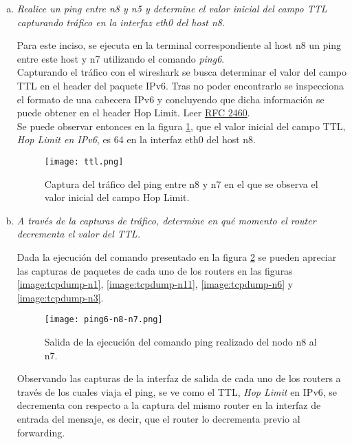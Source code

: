 \documentclass[osajnl,twocolumn,showpacs,superscriptaddress,10pt]{revtex4-1} %
\begin{document}
\begin{enumerate}[a)]
    \item \textit{Realice un ping entre n8 y n5 y determine el valor inicial del
    campo TTL capturando tráfico en la interfaz eth0 del host n8.}

    Para este inciso, se ejecuta en la terminal correspondiente al host n8 un ping entre este host y n7
    utilizando el comando \textit{ping6}. \\

    Capturando el tráfico con el wireshark se busca determinar el valor del campo TTL en
    el header del paquete IPv6. Tras no poder encontrarlo se inspecciona el formato de una
    cabecera IPv6 y concluyendo que dicha información se puede obtener en el header Hop Limit. 
    Leer \href{https://tools.ietf.org/html/rfc2460}{RFC 2460}. \\

    Se puede observar entonces en la figura \ref{image:ttl}, que el valor inicial
    del campo TTL, \textit{Hop Limit en IPv6}, es 64 en la interfaz eth0 del host n8.

    \begin{figure}[H]
        \centering
        \texttt{[image: ttl.png]}
        \caption{Captura del tráfico del ping entre n8 y n7 en el que se observa el valor inicial del campo Hop Limit.}
        \label{image:ttl}
    \end{figure}

    \item \textit{A través de la capturas de tráfico, determine en qué momento el
    router decrementa el valor del TTL.}

    Dada la ejecución del comando presentado en la figura \ref{image:ping6-n8-n7} se pueden apreciar las capturas de paquetes de cada 
    uno de los routers en las figuras \ref{image:tcpdump-n1}, \ref{image:tcpdump-n11}, \ref{image:tcpdump-n6} y \ref{image:tcpdump-n3}.

    \begin{figure}[H]
        \centering
        \texttt{[image: ping6-n8-n7.png]}
        \caption{Salida de la ejecución del comando ping realizado del nodo n8 al n7.}
        \label{image:ping6-n8-n7}
    \end{figure}

    Observando las capturas de la interfaz de salida de cada uno de los routers a través de los cuales viaja el ping, 
    se ve como el TTL, \textit{Hop Limit} en IPv6, se decrementa con respecto a la captura del mismo router en la interfaz 
    de entrada del mensaje, es decir, que el router lo decrementa previo al forwarding. \\


\end{enumerate}
\end{document}

